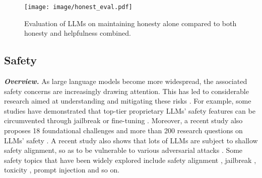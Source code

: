 \vspace{10pt}
\begin{figure}[H]
    \centering
    \texttt{[image: image/honest\_eval.pdf]}
    \vspace{-10pt}
    \caption{Evaluation of LLMs on maintaining honesty alone compared to both honesty and helpfulness combined.}
    \label{fig:honest_evaluation}
\end{figure}







\clearpage

\subsection{Safety}



\textbf{\textit{Overview.}} As large language models become more widespread, the associated safety concerns are increasingly drawing attention. This has led to considerable research aimed at understanding and mitigating these risks \cite{jailbreakanalysis1, jailbreakanalysis2, multistepattack, latentjailbreak, redteaming, bhardwaj2023redteaming, ethicalsafety, beavertails, xu2023sc, lowresourcejailbreak, inie2023summon, wang2023fake, mu2023llms, schulhoff-etal-2023-ignore, xu2023cognitive, alon2023detecting, fu2023safety, zhao2023causality, liu2023prompt, vega2023bypassing, 299563, yi2023benchmarking, buszydlik2023red, kumar2023certifying, sha2024prompt, zhou2024defending, xu2024llm, xie2024gradsafe, yung2024round, deng2024pandora, guo2024coldattack, xu2024safedecoding, chang2024play, dong2024attacks, chen2024findingsafetyneuronslarge, liu2023goal, li2024tf, du2024detecting, shang2024intentobfuscator, peng2024jailbreaking}. For example, some studies have demonstrated that top-tier proprietary LLMs' safety features can be circumvented through jailbreak \cite{zou2023universal, kang2023masterkey} or fine-tuning \cite{zhan2023removing, pelrine2023exploiting}. Moreover, a recent study also proposes 18 foundational challenges and more than 200 research questions on LLMs' safety \cite{anwar2024foundationalchallengesassuringalignment}. A recent study also shows that lots of LLMs are subject to shallow safety alignment, so as to be vulnerable to various adversarial attacks \cite{qi2024safety}. Some safety topics that have been widely explored include safety alignment \cite{shadowalignment, beavertails, ji2024pku, qi2023fine, wei2024assessing, chen2024finding}, jailbreak \cite{schulhoff-etal-2023-ignore, wei2024jailbroken, jin2024jailbreakzoosurveylandscapeshorizons, liu2024flipattack, jha2024llmstinger, peng2024jailbreaking}, toxicity \cite{wen2023unveiling, trustgpt, luong2024realisticevaluationtoxicitylarge}, prompt injection \cite{liu2024automaticuniversalpromptinjection, zhang2024goalguidedgenerativepromptinjection, li2023rainlanguagemodelsalign,hui2024pleak,shao2024making} and so on.



